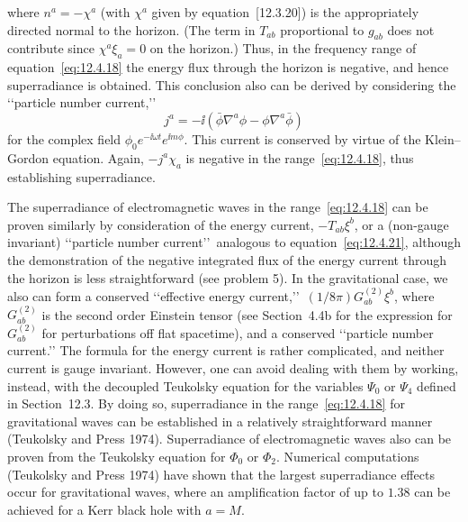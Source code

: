 

where \(n^a=-\chi^a\) (with \(\chi^a\) given by equation~[12.3.20]) is the
appropriately directed normal to the horizon. (The term in \(T_{ab}\) proportional to
\(g_{ab}\) does not contribute since \(\chi^a\xi_a=0\) on the horizon.) Thus, in the
frequency range of equation~\eqref{eq:12.4.18} the energy flux through the horizon
is negative, and hence superradiance is obtained. This conclusion also can be derived
by considering the \lq\lq particle number current,\rq\rq
\begin{equation}
 j^a=-\ii(\bar\phi\nabla^a\phi-\phi\nabla^a\bar\phi)
 \tag{12.4.21}\label{eq:12.4.21}
\end{equation}
for the complex field \(\phi_0e^{-\ii\omega t}e^{\ii m\phi}\). This current is
conserved by virtue of the Klein--Gordon equation. Again, \(-j^a\chi_a\) is negative
in the range~\eqref{eq:12.4.18}, thus establishing superradiance.

The superradiance of electromagnetic waves in the range~\eqref{eq:12.4.18} can be
proven similarly by consideration of the energy current, \(-T_{ab}\xi^b\), or a
(non-gauge invariant) \lq\lq particle number current\rq\rq\ analogous to
equation~\eqref{eq:12.4.21}, although the demonstration of the negative integrated
flux of the energy current through the horizon is less straightforward (see problem
5). In the gravitational case, we also can form a conserved \lq\lq effective energy
current,\rq\rq\ \((1/8\pi)G^{(2)}_{ab}\xi^b\), where \(G^{(2)}_{ab}\) is the second
order Einstein tensor (see Section~4.4b for the expression for \(G^{(2)}_{ab}\) for
perturbations off flat spacetime), and a conserved \lq\lq particle number current.\rq\rq
The formula for the energy current is rather complicated, and neither current is gauge
invariant. However, one can avoid dealing with them by working, instead, with the
decoupled Teukolsky equation for the variables \(\Psi_0\) or \(\Psi_4\) defined in
Section~12.3. By doing so, superradiance in the range~\eqref{eq:12.4.18} for
gravitational waves can be established in a relatively straightforward manner
(Teukolsky and Press 1974). Superradiance of electromagnetic waves also can be
proven from the Teukolsky equation for \(\Phi_0\) or \(\Phi_2\). Numerical
computations (Teukolsky and Press 1974) have shown that the largest superradiance
effects occur for gravitational waves, where an amplification factor of up to \(1.38\)
can be achieved for a Kerr black hole with \(a=M\).

